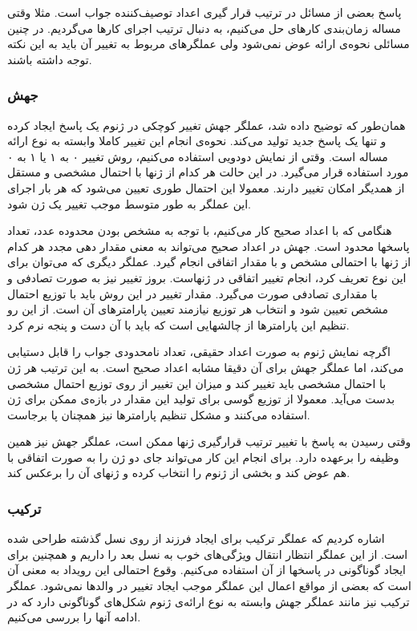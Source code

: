 \documentclass{report}
\begin{document}
پاسخ بعضی از مسائل در ترتیب قرار گیری اعداد توصیف‌کننده جواب است. مثلا وقتی مساله زمان‌بندی کارهای حل می‌کنیم، به دنبال ترتیب اجرای کارها می‌گردیم. در چنین مسائلی نحوه‌ی ارائه عوض نمی‌شود ولی عملگرهای مربوط به تغییر آن باید به این نکته توجه داشته باشند.

\subsubsection{جهش}
همان‌طور که توضیح داده شد، عملگر جهش تغییر کوچکی در ژنوم یک پاسخ ایجاد کرده و تنها یک پاسخ جدید تولید می‌کند. نحوه‌ی انجام این تغییر کاملا وابسته به نوع ارائه مساله است. وقتی از نمایش دودویی استفاده می‌کنیم، روش تغییر ۰ به ۱ یا ۱ به ۰ مورد استفاده قرار می‌گیرد. در این حالت هر کدام از ژنها با احتمال مشخصی و مستقل از همدیگر امکان تغییر دارند. معمولا این احتمال طوری تعیین می‌شود که هر بار اجرای این عملگر به طور متوسط موجب تغییر یک ژن شود.

هنگامی که با اعداد صحیح کار می‌کنیم، با توجه به مشخص بودن محدوده عدد، تعداد پاسخها محدود است. جهش در اعداد صحیح می‌تواند به معنی مقدار دهی مجدد هر کدام از ژنها با احتمالی مشخص و با مقدار اتفاقی انجام گیرد. عملگر دیگری که می‌توان برای این نوع تعریف کرد، انجام تغییر اتفاقی در ژنهاست. بروز تغییر نیز به صورت تصادفی و با مقداری تصادفی صورت می‌گیرد. مقدار تغییر در این روش باید با توزیع احتمال مشخص تعیین شود و انتخاب هر توزیع نیازمند تعیین پارامترهای آن است. از این رو تنظیم این پارامترها از چالشهایی است که باید با آن دست و پنجه نرم کرد.

اگرچه نمایش ژنوم به صورت اعداد حقیقی، تعداد نامحدودی جواب را قابل دستیابی می‌کند، اما عملگر جهش برای آن دقیقا مشابه اعداد صحیح است. به این ترتیب هر ژن با احتمال مشخصی باید تغییر کند و میزان این تغییر از روی توزیع احتمال مشخصی بدست می‌آید. معمولا از توزیع گوسی برای تولید این مقدار در بازه‌ی ممکن برای ژن استفاده می‌کنند و مشکل تنظیم پارامترها نیز همچنان پا برجاست.

وقتی رسیدن به پاسخ با تغییر ترتیب قرارگیری ژنها ممکن است، عملگر جهش نیز همین وظیفه را برعهده دارد. برای انجام این کار می‌تواند جای دو ژن را به صورت اتفاقی با هم عوض کند و بخشی از ژنوم را انتخاب کرده و ژنهای آن را برعکس کند.

\subsubsection{ترکیب}
اشاره کردیم که عملگر ترکیب برای ایجاد فرزند از روی نسل گذشته طراحی شده است. از این عملگر انتظار انتقال ويژگی‌های خوب به نسل بعد را داریم و همچنین برای ایجاد گوناگونی در پاسخها از آن استفاده می‌کنیم. وقوع احتمالی این رویداد به معنی آن است که بعضی از مواقع اعمال این عملگر موجب ایجاد تغییر در والدها نمی‌شود. عملگر ترکیب نیز مانند عملگر جهش وابسته به نوع ارائه‌ی ژنوم شکل‌های گوناگونی دارد که در ادامه آنها را بررسی می‌کنیم.
\end{document}
